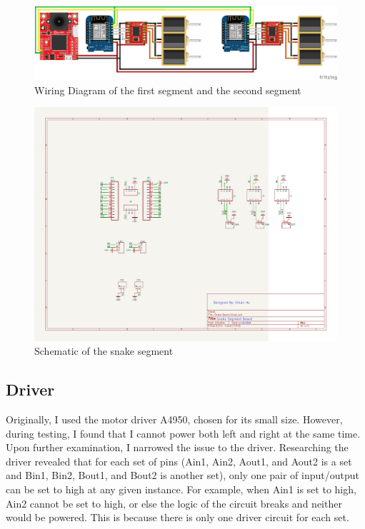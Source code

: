 \documentclass[twoside]{article}
\begin{document}
\begin{figure} [H]
	\centering
	\includegraphics[width=\linewidth]{wiring_diagram}
	\caption{Wiring Diagram of the first segment and the second segment}
\end{figure}

\begin{figure} [H]
\centering
	\includegraphics[width=\linewidth]{snake segment board circuit diagram}
	\caption{Schematic of the snake segment}
\end{figure}

\subsection{Driver}

Originally, I used the motor driver A4950, chosen for its small size. However, during testing, I found that I cannot power both left and right at the same time. Upon further examination, I narrowed the issue to the driver. Researching the driver revealed that for each set of pins (Ain1, Ain2, Aout1, and Aout2 is a set and Bin1, Bin2, Bout1, and Bout2 is another set), only one pair of input/output can be set to high at any given instance. For example, when Ain1 is set to high, Ain2 cannot be set to high, or else the logic of the circuit breaks and neither would be powered. This is because there is only one driver circuit for each set.
\end{document}
